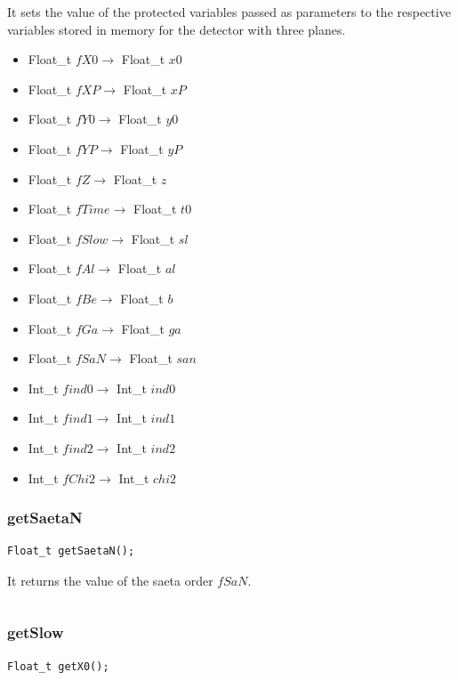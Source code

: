 \documentclass[a4paper]{book}
\begin{document}
It sets the value of the protected variables passed as parameters to the respective variables stored in memory for the detector with three planes.

\begin{itemize}
	\item Float\_t $fX0 \rightarrow$ Float\_t $x0$
	\item Float\_t $fXP \rightarrow$ Float\_t $xP$
	\item Float\_t $fY0 \rightarrow$ Float\_t $y0$
	\item Float\_t $fYP \rightarrow$ Float\_t $yP$
	\item Float\_t $fZ \rightarrow$ Float\_t $z$
	\item Float\_t $fTime \rightarrow$ Float\_t $t0$
	\item Float\_t $fSlow \rightarrow$ Float\_t $sl$
	\item Float\_t $fAl \rightarrow$ Float\_t $al$
	\item Float\_t $fBe \rightarrow$ Float\_t $b$
	\item Float\_t $fGa \rightarrow$ Float\_t $ga$
	\item Float\_t $fSaN \rightarrow$ Float\_t $san$
	\item Int\_t $find0 \rightarrow$ Int\_t $ind0$
	\item Int\_t $find1 \rightarrow$ Int\_t $ind1$
	\item Int\_t $find2 \rightarrow$ Int\_t $ind2$
	\item Int\_t $fChi2 \rightarrow$ Int\_t $chi2$
\end{itemize}

\subsubsection{getSaetaN}

\begin{lstlisting}
Float_t getSaetaN();
\end{lstlisting}

It returns the value of the saeta order $fSaN$.

\[\]

\subsubsection{getSlow}

\begin{lstlisting}
Float_t getX0();
\end{lstlisting}
\end{document}
